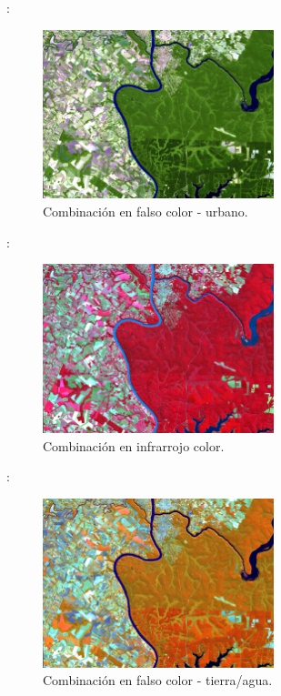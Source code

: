 \documentclass[handout,aspectratio=169]{beamer}
\begin{document}
\begin{frame}{\secname : \subsecname}
    \begin{figure}[h!]
        \centering
        \includegraphics[width=0.6\textwidth]{12-11-4.jpeg}
        \caption{Combinación en falso color - urbano.}
        \label{12-11-4}
    \end{figure}
\end{frame}

\begin{frame}{\secname : \subsecname}
    \begin{figure}[h!]
        \centering
        \includegraphics[width=0.6\textwidth]{8-4-3.jpeg}
        \caption{Combinación en infrarrojo color.}
        \label{8-4-3}
    \end{figure}
\end{frame}

\begin{frame}{\secname : \subsecname}
    \begin{figure}[h!]
        \centering
        \includegraphics[width=0.6\textwidth]{8-11-4.jpeg}
        \caption{Combinación en falso color - tierra/agua.}
        \label{8-11-4}
    \end{figure}
\end{frame}
\end{document}
